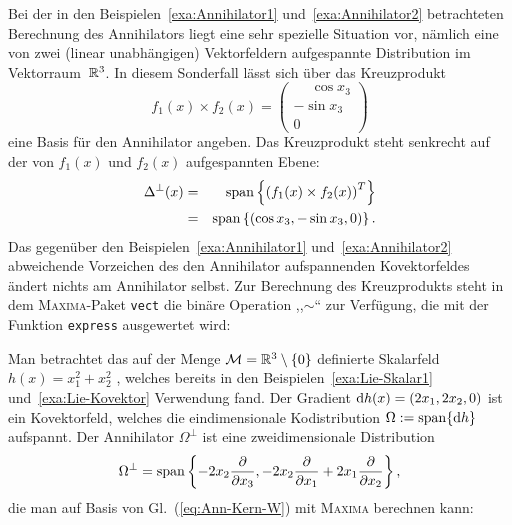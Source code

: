 \begin{example}
\label{exa:Annihilator3}Bei der in den Beispielen~\ref{exa:Annihilator1}
und~\ref{exa:Annihilator2} betrachteten Berechnung des Annihilators
liegt eine sehr spezielle Situation vor, nämlich eine von zwei (linear
unabhängigen) Vektorfeldern aufgespannte Distribution im Vektorraum~${\mathbb{R}}^{3}$.
In diesem Sonderfall lässt sich über das Kreuzprodukt 
\[
f_{1}(x)\times f_{2}(x)=\left(\begin{array}{c}
\phantom{{-}}\cos x_{3}\\
-\sin x_{3}\\
0
\end{array}\right)
\]
eine Basis für den Annihilator angeben. Das Kreuzprodukt
steht senkrecht auf der von $f_{1}(x)$ und $f_{2}(x)$ aufgespannten
Ebene: 
\begin{eqnarray*}
\Delta^{\perp}(x) & = & {\operatorname{span}}\left\{ \left(f_{1}(x)\times f_{2}(x)\right)^{T}\right\} \\
 & = & {\operatorname{span}}\left\{ \left(\cos x_{3},-\sin x_{3},0\right)\right\} .
\end{eqnarray*}
Das gegenüber den Beispielen~\ref{exa:Annihilator1} und~\ref{exa:Annihilator2}
abweichende Vorzeichen des den Annihilator aufspannenden Kovektorfeldes
ändert nichts am Annihilator selbst. Zur Berechnung des Kreuzprodukts
steht in dem \textsc{Maxima}-Paket \texttt{vect} die binäre Operation
,,$\sim$`` zur Verfügung, die mit der Funktion \texttt{express}
ausgewertet wird:
\end{example}
\begin{maxima}\end{maxima}

\begin{example}
\label{exa:Annihilator-Kodistribution}Man betrachtet das auf der
Menge $\mathcal{M}={\mathbb{R}}^{3}\setminus\{0\}$ definierte Skalarfeld $h(x)=x_{1}^{2}+x_{2}^{2}$
, welches bereits in den Beispielen~\ref{exa:Lie-Skalar1} und~\ref{exa:Lie-Kovektor}
Verwendung fand. Der Gradient ${\mathrm{d}} h(x)=(2x_{1},2x_{2},0)$ ist ein
Kovektorfeld, welches die eindimensionale Kodistribution $\Omega:={\operatorname{span}}\{{\mathrm{d}} h\}$
aufspannt. Der Annihilator $\Omega^{\perp}$ ist eine zweidimensionale
Distribution 
\[
\Omega^{\perp}={\operatorname{span}}\left\{ -2x_{2}\frac{\partial}{\partial x_{3}},-2x_{2}\frac{\partial}{\partial x_{1}}+2x_{1}\frac{\partial}{\partial x_{2}}\right\} ,
\]
die man auf Basis von Gl.~(\ref{eq:Ann-Kern-W}) mit \textsc{Maxima}
berechnen kann:

\begin{maxima}\end{maxima}
\end{example}
\medskip{}

